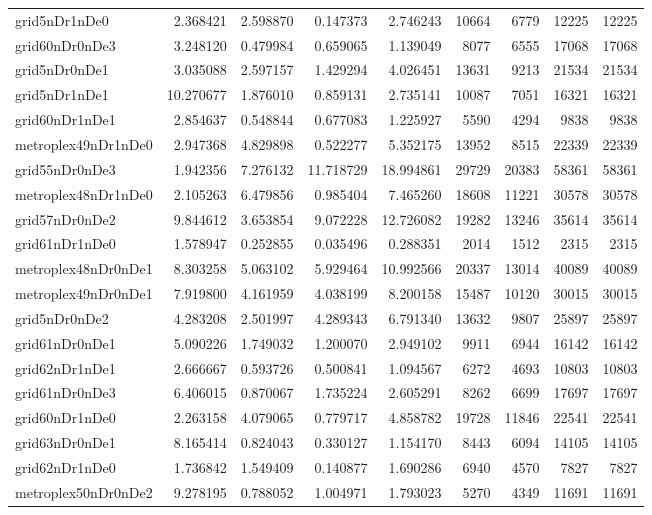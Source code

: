 \begin{longtable}{|l|r|r|r|r|r|r|r|r|}
grid5nDr1nDe0 & 2.368421 & 2.598870 & 0.147373 & 2.746243 & 10664 & 6779 & 12225 & 12225 \\
grid60nDr0nDe3 & 3.248120 & 0.479984 & 0.659065 & 1.139049 & 8077 & 6555 & 17068 & 17068 \\
grid5nDr0nDe1 & 3.035088 & 2.597157 & 1.429294 & 4.026451 & 13631 & 9213 & 21534 & 21534 \\
grid5nDr1nDe1 & 10.270677 & 1.876010 & 0.859131 & 2.735141 & 10087 & 7051 & 16321 & 16321 \\
grid60nDr1nDe1 & 2.854637 & 0.548844 & 0.677083 & 1.225927 & 5590 & 4294 & 9838 & 9838 \\
metroplex49nDr1nDe0 & 2.947368 & 4.829898 & 0.522277 & 5.352175 & 13952 & 8515 & 22339 & 22339 \\
grid55nDr0nDe3 & 1.942356 & 7.276132 & 11.718729 & 18.994861 & 29729 & 20383 & 58361 & 58361 \\
metroplex48nDr1nDe0 & 2.105263 & 6.479856 & 0.985404 & 7.465260 & 18608 & 11221 & 30578 & 30578 \\
grid57nDr0nDe2 & 9.844612 & 3.653854 & 9.072228 & 12.726082 & 19282 & 13246 & 35614 & 35614 \\
grid61nDr1nDe0 & 1.578947 & 0.252855 & 0.035496 & 0.288351 & 2014 & 1512 & 2315 & 2315 \\
metroplex48nDr0nDe1 & 8.303258 & 5.063102 & 5.929464 & 10.992566 & 20337 & 13014 & 40089 & 40089 \\
metroplex49nDr0nDe1 & 7.919800 & 4.161959 & 4.038199 & 8.200158 & 15487 & 10120 & 30015 & 30015 \\
grid5nDr0nDe2 & 4.283208 & 2.501997 & 4.289343 & 6.791340 & 13632 & 9807 & 25897 & 25897 \\
grid61nDr0nDe1 & 5.090226 & 1.749032 & 1.200070 & 2.949102 & 9911 & 6944 & 16142 & 16142 \\
grid62nDr1nDe1 & 2.666667 & 0.593726 & 0.500841 & 1.094567 & 6272 & 4693 & 10803 & 10803 \\
grid61nDr0nDe3 & 6.406015 & 0.870067 & 1.735224 & 2.605291 & 8262 & 6699 & 17697 & 17697 \\
grid60nDr1nDe0 & 2.263158 & 4.079065 & 0.779717 & 4.858782 & 19728 & 11846 & 22541 & 22541 \\
grid63nDr0nDe1 & 8.165414 & 0.824043 & 0.330127 & 1.154170 & 8443 & 6094 & 14105 & 14105 \\
grid62nDr1nDe0 & 1.736842 & 1.549409 & 0.140877 & 1.690286 & 6940 & 4570 & 7827 & 7827 \\
metroplex50nDr0nDe2 & 9.278195 & 0.788052 & 1.004971 & 1.793023 & 5270 & 4349 & 11691 & 11691 \\

\end{longtable}
